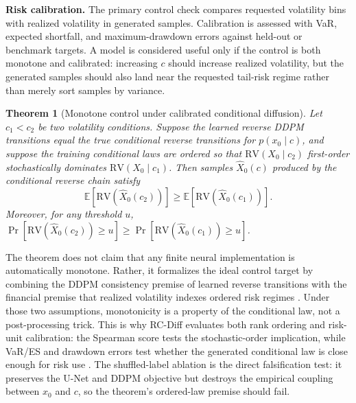 \documentclass[letterpaper]{article}
\newtheorem{theorem}{Theorem}
\begin{document}
\textbf{Risk calibration.} The primary control check compares requested volatility bins with realized volatility in generated samples. Calibration is assessed with VaR, expected shortfall, and maximum-drawdown errors against held-out or benchmark targets. A model is considered useful only if the control is both monotone and calibrated: increasing $c$ should increase realized volatility, but the generated samples should also land near the requested tail-risk regime rather than merely sort samples by variance.

\begin{theorem}[Monotone control under calibrated conditional diffusion]
\label{thm:monotone-control}
Let $c_1<c_2$ be two volatility conditions. Suppose the learned reverse DDPM transitions equal the true conditional reverse transitions for $p(x_0\mid c)$, and suppose the training conditional laws are ordered so that $\mathrm{RV}(X_0\mid c_2)$ first-order stochastically dominates $\mathrm{RV}(X_0\mid c_1)$. Then samples $\hat{X}_0(c)$ produced by the conditional reverse chain satisfy
\begin{equation}
  \mathbb{E}[\mathrm{RV}(\hat{X}_0(c_2))]\geq \mathbb{E}[\mathrm{RV}(\hat{X}_0(c_1))].
\end{equation}
Moreover, for any threshold $u$, $\Pr[\mathrm{RV}(\hat{X}_0(c_2))\geq u]\geq \Pr[\mathrm{RV}(\hat{X}_0(c_1))\geq u]$.
\end{theorem}

The theorem does not claim that any finite neural implementation is automatically monotone. Rather, it formalizes the ideal control target by combining the DDPM consistency premise of learned reverse transitions \citep{ho2020ddpm,song2021score} with the financial premise that realized volatility indexes ordered risk regimes \citep{engle1982arch,bollerslev1986garch,mcneil2015quantitative}. Under those two assumptions, monotonicity is a property of the conditional law, not a post-processing trick. This is why RC-Diff evaluates both rank ordering and risk-unit calibration: the Spearman score tests the stochastic-order implication, while VaR/ES and drawdown errors test whether the generated conditional law is close enough for risk use \citep{artzner1999coherent,acerbi2002expected,fissler2016higher}. The shuffled-label ablation is the direct falsification test: it preserves the U-Net and DDPM objective but destroys the empirical coupling between $x_0$ and $c$, so the theorem's ordered-law premise should fail.
\end{document}
